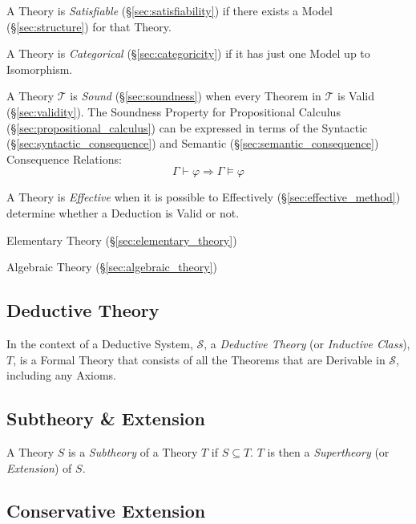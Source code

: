 A Theory is \emph{Satisfiable} (\S\ref{sec:satisfiability}) if there
exists a Model (\S\ref{sec:structure}) for that Theory.

A Theory is \emph{Categorical} (\S\ref{sec:categoricity}) if it has
just one Model up to Isomorphism.

A Theory $\mathcal{T}$ is \emph{Sound} (\S\ref{sec:soundness}) when
every Theorem in $\mathcal{T}$ is Valid (\S\ref{sec:validity}). The
Soundness Property for Propositional Calculus
(\S\ref{sec:propositional_calculus}) can be expressed in terms of the
Syntactic (\S\ref{sec:syntactic_consequence}) and Semantic
(\S\ref{sec:semantic_consequence}) Consequence Relations:
\[
  \Gamma \vdash \varphi \Rightarrow \Gamma \vDash \varphi
\]

A Theory is \emph{Effective} when it is possible to Effectively
(\S\ref{sec:effective_method}) determine whether a Deduction is Valid
or not.

Elementary Theory (\S\ref{sec:elementary_theory})

Algebraic Theory (\S\ref{sec:algebraic_theory})



\subsection{Deductive Theory}\label{sec:deductive_theory}

In the context of a Deductive System, $\mathcal{S}$, a \emph{Deductive
  Theory} (or \emph{Inductive Class}), $T$, is a Formal Theory that
consists of all the Theorems that are Derivable in $\mathcal{S}$,
including any Axioms.



\subsection{Subtheory \& Extension}\label{sec:subtheory}

A Theory $S$ is a \emph{Subtheory} of a Theory $T$ if $S \subseteq T$.
$T$ is then a \emph{Supertheory} (or \emph{Extension}) of $S$.



\subsection{Conservative Extension}\label{sec:conservative_extension}

